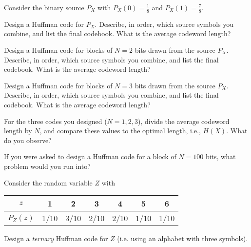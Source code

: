 \documentclass[a4paper,10pt,landscape,twocolumn]{scrartcl}
\begin{document}
\homeworkproblems


\begin{exercise}
	\begin{subex}[(4pt)]
    Consider the binary source $P_X$ with $P_X(0) = \frac{1}{8}$ and $P_X(1) = \frac{7}{8}$.
    
    Design a Huffman code for $P_X$. Describe, in order, which source symbols you combine, and list the final codebook. What is the average codeword length?
	\end{subex}
\begin{subex}[(4pt)]
	Design a Huffman code for blocks of $N=2$ bits drawn from the source $P_X$. Describe, in order, which source symbols you combine, and list the final codebook. What is the average codeword length?
\end{subex}
\begin{subex}[(4pt)]
	Design a Huffman code for blocks of $N=3$ bits drawn from the source $P_X$. Describe, in order, which source symbols you combine, and list the final codebook. What is the average codeword length?
\end{subex}
\begin{subex}[(4pt)]
	For the three codes you designed ($N=1,2,3$), divide the average codeword length by $N$, and compare these values to the optimal length, i.e., $H(X)$. What do you observe?
\end{subex}
	\begin{subex}[(1pt)]
	If you were asked to design a Huffman code for a block of $N = 100$ bits, what problem would you run into?
	\end{subex}
	\begin{subex}[(2pt)]
	Consider the random variable $Z$ with
	\begin{center}
	\begin{tabular}{c | c c c c c c}
	$z$ & 1 & 2 & 3 & 4 & 5 & 6\\
	\hline
	$P_Z(z)$ & 1/10 & 3/10 & 2/10 & 2/10 & 1/10 & 1/10\\
	\end{tabular}
	\end{center}
	Design a \emph{ternary} Huffman code for $Z$ (i.e. using an alphabet with three symbols).
	\end{subex}
\end{exercise}
\end{document}
